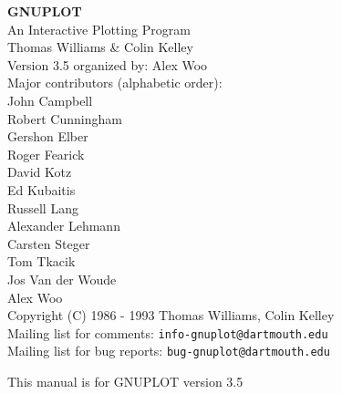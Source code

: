 %
%
\ifx\undefined\selectfont %
\else
{}
\fi
\setlength{\textwidth}{6.25in}
\setlength{\oddsidemargin}{0.5cm}
\setlength{\topmargin}{-0.5in}
\setlength{\textheight}{9in}
\setlength{\parskip}{1ex}
\setlength{\parindent}{0pt}
\adjustarticle
\setlength{\threenum}{4.0em} %


\pagestyle{empty}
   \rule{0in}{3in}
   \begin{center}
   {\huge\bf GNUPLOT}\\
   \vspace{3ex}
   {\Large An Interactive Plotting Program}\\
   \vspace{2ex}
   \large
   Thomas Williams \& Colin Kelley\\
   \vspace{2ex}
   Version 3.5 organized by: Alex Woo \\
   Major contributors (alphabetic order):\\
  John Campbell\\
  Robert Cunningham\\
  Gershon Elber\\
  Roger Fearick\\
  David Kotz\\
  Ed Kubaitis\\
  Russell Lang\\
  Alexander Lehmann\\
  Carsten Steger\\
  Tom Tkacik\\
  Jos Van der Woude \\
  Alex Woo\\
  Copyright (C) 1986 - 1993   Thomas Williams, Colin Kelley\\
   \vspace{3ex}
   Mailing list for comments: \verb+info-gnuplot@dartmouth.edu+\\
   Mailing list for bug reports: \verb+bug-gnuplot@dartmouth.edu+

   \vfill
   {\small This manual is for GNUPLOT version 3.5\\
   }

   \end{center}
\newpage

\tableofcontents
\newpage

\setcounter{page}{1}
\pagestyle{myheadings}
